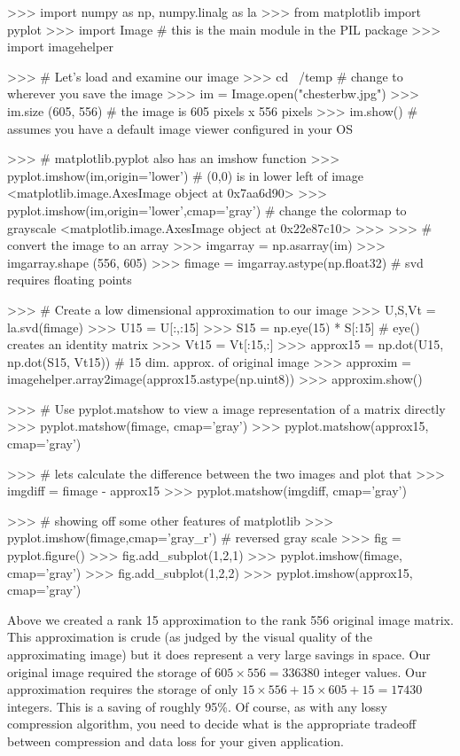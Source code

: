 \begin{python}
>>> import numpy as np, numpy.linalg as la
>>> from matplotlib import pyplot
>>> import Image # this is the main module in the PIL package
>>> import imagehelper

>>>  # Let's load and examine our image
>>> cd ~/temp # change to wherever you save the image
>>> im = Image.open("chesterbw.jpg")
>>> im.size
(605, 556) # the image is 605 pixels x 556 pixels
>>> im.show() # assumes you have a default image viewer configured in your OS
 
>>> # matplotlib.pyplot also has an imshow function
>>> pyplot.imshow(im,origin='lower') # (0,0) is in lower left of image
<matplotlib.image.AxesImage object at 0x7aa6d90>
>>> pyplot.imshow(im,origin='lower',cmap='gray') # change the colormap to grayscale
<matplotlib.image.AxesImage object at 0x22e87c10>
>>>
>>>   # convert the image to an array
>>> imgarray = np.asarray(im)
>>> imgarray.shape
(556, 605)
>>> fimage = imgarray.astype(np.float32) # svd requires floating points

>>>   # Create a low dimensional approximation to our image
>>> U,S,Vt = la.svd(fimage)
>>> U15 = U[:,:15]
>>> S15 = np.eye(15) * S[:15] # eye() creates an identity matrix
>>> Vt15 = Vt[:15,:]
>>> approx15 = np.dot(U15, np.dot(S15, Vt15)) # 15 dim. approx. of original image
>>> approxim = imagehelper.array2image(approx15.astype(np.uint8))
>>> approxim.show()

>>>    # Use pyplot.matshow to view a image representation of a matrix directly
>>> pyplot.matshow(fimage, cmap='gray')
>>> pyplot.matshow(approx15, cmap='gray')

>>>    # lets calculate the difference between the two images and plot that
>>> imgdiff = fimage - approx15
>>> pyplot.matshow(imgdiff, cmap='gray')

>>>    # showing off some other features of matplotlib
>>> pyplot.imshow(fimage,cmap='gray_r') # reversed gray scale
>>> fig = pyplot.figure()
>>> fig.add_subplot(1,2,1)
>>> pyplot.imshow(fimage, cmap='gray')
>>> fig.add_subplot(1,2,2)
>>> pyplot.imshow(approx15, cmap='gray')

\end{python}

Above we created a rank 15 approximation to the rank 556 original image matrix. This approximation is crude (as judged by the visual quality of the approximating image) but it does represent a very large savings in space. Our original image required the storage of $605 \times 556 = 336380$ integer values. Our approximation requires the storage of only $15 \times 556 + 15 \times 605 + 15 = 17430$ integers. This is a saving of roughly 95\%. Of course, as with any lossy compression algorithm, you need to decide what is the appropriate tradeoff between compression and data loss for your given application.

